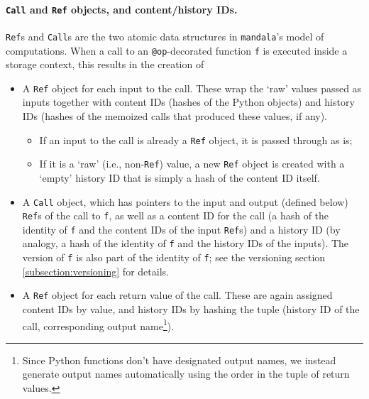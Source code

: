 \paragraph{\texttt{Call} and \texttt{Ref} objects, and content/history IDs.}
\texttt{Ref}s and \texttt{Call}s are the two atomic data structures in
\texttt{mandala}'s model of computations. When a call to an
\texttt{@op}-decorated function \texttt{f} is executed inside a storage context,
this results in the creation of
\begin{itemize}
\item A \texttt{Ref} object for each input to the call. These wrap the `raw'
values passed as inputs together with content IDs (hashes of the Python objects)
and history IDs (hashes of the memoized calls that produced these values, if
any).
\begin{itemize}
\item If an input to the call is already a \texttt{Ref} object, it is passed
through as is;
\item If it is a `raw' (i.e., non-\texttt{Ref}) value, a new \texttt{Ref} object
is created with a `empty' history ID that is simply a hash of the content ID
itself.
\end{itemize}
\item A \texttt{Call} object, which has pointers to the input and output
(defined below) \texttt{Ref}s of the call to \texttt{f}, as well as a content ID
for the call (a hash of the identity of \texttt{f} and the content IDs of the
input \texttt{Ref}s) and a history ID (by analogy, a hash of the identity of
\texttt{f} and the history IDs of the inputs). The version of \texttt{f} is also part of the identity of \texttt{f}; see the versioning section \ref{subsection:versioning} for details.
\item A \texttt{Ref} object for each return value of the call. These are again
assigned content IDs by value, and history IDs by hashing the tuple (history ID
of the call, corresponding output name\footnote{Since Python functions don't
have designated output names, we instead generate output names automatically using the order in the tuple of return values.}).
\end{itemize}



